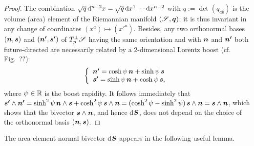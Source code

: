 \begin{proof}
The combination $\sqrt{q}\, \mathrm{d}^{n-2} x = \sqrt{q}\, \mathrm{d} x^1 \cdots \mathrm{d} x^{n-2}$ with
$q := \det(q_{ab})$ is the volume (area)
element of the Riemannian manifold $(\mathscr{S},\bm{q})$; it is thus invariant in any change of coordinates
$(x^a) \mapsto ({x'}^a)$. Besides, any two orthonormal bases $(\bm{n},\bm{s})$
and $(\bm{n'},\bm{s'})$ of $T_p^\perp\mathscr{S}$ having the same orientation
and with $\bm{n}$ and $\bm{n'}$ both future-directed are necessarily related by a
2-dimensional Lorentz boost (cf. Fig.~??):
\[
   \left\{\begin{array}{l}
    \bm{n'} = \cosh\psi \, \bm{n} + \sinh\psi \, \bm{s} \\
    \bm{s'} = \sinh\psi \, \bm{n} + \cosh\psi \, \bm{s} ,
    \end{array}\right.
\]
where $\psi\in\mathbb{R}$ is the boost rapidity. It follows immediately
that $\bm{s'}\wedge\bm{n'} = \sinh^2\psi \, \bm{n}\wedge\bm{s} + \cosh^2\psi \, \bm{s}\wedge\bm{n}
= ( \cosh^2\psi - \sinh^2\psi )\,  \bm{s}\wedge\bm{n} = \bm{s}\wedge\bm{n}$, which
shows that the bivector $\bm{s}\wedge\bm{n}$, and hence $\mathrm{d} \bm{S}$, does not depend on the
choice of the orthonormal basis $(\bm{n},\bm{s})$.
\end{proof}

The area element normal bivector $\mathrm{d}\bm{S}$ appears in the following useful lemma.

